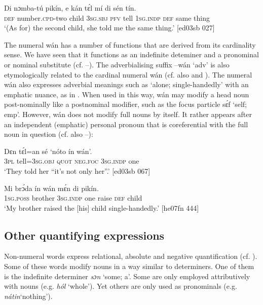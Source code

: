 \ea%
    \label{ex:key:256}
    \gll Di  nɔmba-tú    pikín,  e    kán  tɛ́l  mí    di  sén    tín.\\
\textsc{def}  number.\textsc{cpd}{}-two  child  \textsc{3sg.sbj}  \textsc{pfv}  tell  \textsc{1sg.indp}  \textsc{def}  same  thing\\

\glt ‘(As for) the second child, she told me the same thing.’ [ed03sb 027]
\z

The numeral wán has a number of functions that are derived from its cardinality sense. We have seen that it functions as an indefinite deteminer and a pronominal or nominal substitute (cf. –). The adverbialising suffix –wán ‘adv’ is also etymologically related to the cardinal numeral wán (cf. also  and ). The numeral wán also expresses adverbial meanings such as ‘alone; single-handedly’ with an emphatic{\fff} nuance, as in . When used in this way, wán may modify a head noun post-nominally like a postnominal modifier, such as the focus particle sɛ́f ‘self; emp’. However, wán does not modify full nouns by itself. It rather appears after an independent (emphatic) personal pronoun that is coreferential with the full noun in question  (cf. also –):


\ea%
    \label{ex:key:257}
    \gll Dɛn    tɛ́l=an    sé    ‘nóto  ín    wán’.\\
\textsc{3pl}    tell=\textsc{3sg.obj}  \textsc{quot}    \textsc{neg}.\textsc{foc}  \textsc{3sg.indp}  one\\

\glt ‘They told her “it’s not only her”.’ [ed03sb 067]
\z


\ea%
    \label{ex:key:258}
    \gll Mi    brɔ́da  ín    wán    mɛ́n    di  pikín. \\
\textsc{1sg.poss}  brother  3\textsc{sg.indp}  one    raise  \textsc{def}  child\\

\glt ‘My brother raised the [his] child single-handedly.’ [he07fn 444]
\z

\subsection{Other quantifying expressions}

Non-numeral words express relational, absolute and negative quantification (cf. ). Some of these words modify nouns in a way similar to determiners. One of them is the indefinite determiner \textit{sɔn} ‘some; a’. Some are only employed attributively with nouns (e.g. \textit{hól} ‘whole’). Yet others are only used as pronominals (e.g. \textit{nátin}‘nothing’).

